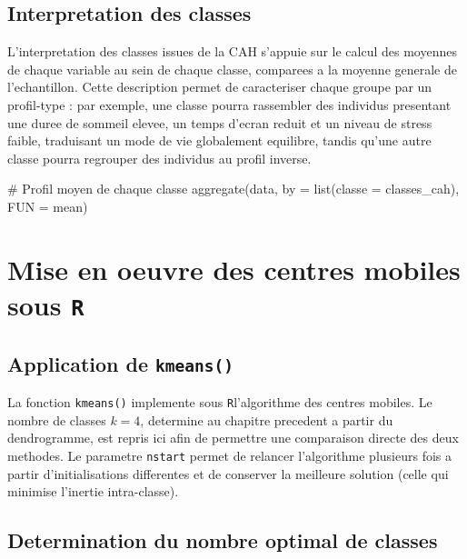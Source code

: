 \documentclass[12pt,a4paper]{book}
\newcommand{\R}{\texttt{R}}
\begin{document}
	\section{Interpretation des classes}
	
	L'interpretation des classes issues de la CAH s'appuie sur le calcul des moyennes de chaque variable au sein de chaque classe, comparees a la moyenne generale de l'echantillon. Cette description permet de caracteriser chaque groupe par un profil-type : par exemple, une classe pourra rassembler des individus presentant une duree de sommeil elevee, un temps d'ecran reduit et un niveau de stress faible, traduisant un mode de vie globalement equilibre, tandis qu'une autre classe pourra regrouper des individus au profil inverse.
	
	\begin{Rscript}
		# Profil moyen de chaque classe
		aggregate(data, by = list(classe = classes_cah), FUN = mean)
	\end{Rscript}
	
	\chapter{Mise en oeuvre des centres mobiles sous \R}
	
	\section{Application de \texttt{kmeans()}}
	
	La fonction \texttt{kmeans()} implemente sous \R l'algorithme des centres mobiles. Le nombre de classes $k = 4$, determine au chapitre precedent a partir du dendrogramme, est repris ici afin de permettre une comparaison directe des deux methodes. Le parametre \texttt{nstart} permet de relancer l'algorithme plusieurs fois a partir d'initialisations differentes et de conserver la meilleure solution (celle qui minimise l'inertie intra-classe).
	
	
	\section{Determination du nombre optimal de classes}
	
\end{document}
